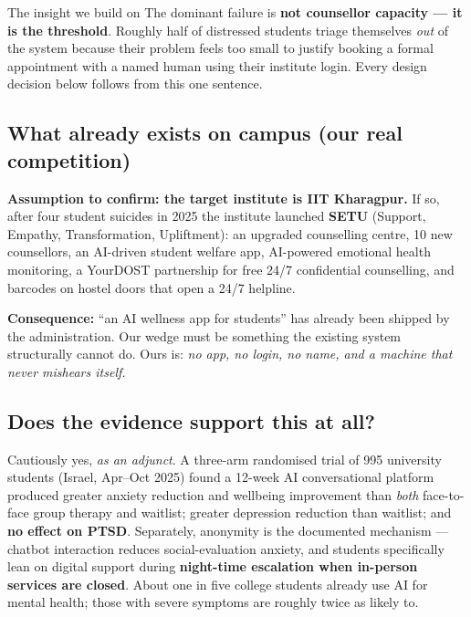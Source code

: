 \documentclass[11pt,a4paper]{article}
\begin{document}
\begin{keybox}{The insight we build on}
The dominant failure is \textbf{not counsellor capacity --- it is the threshold}.
Roughly half of distressed students triage themselves \emph{out} of the system because
their problem feels too small to justify booking a formal appointment with a named human
using their institute login. Every design decision below follows from this one sentence.
\end{keybox}

\subsection{What already exists on campus (our real competition)}

\textbf{Assumption to confirm: the target institute is IIT Kharagpur.}
If so, after four student suicides in 2025 the institute launched \textbf{SETU}
(Support, Empathy, Transformation, Upliftment): an upgraded counselling centre,
10 new counsellors, an AI-driven student welfare app, AI-powered emotional
health monitoring, a YourDOST partnership for free 24/7 confidential counselling,
and barcodes on hostel doors that open a 24/7 helpline.

\vspace{0.3em}
\textbf{Consequence:} ``an AI wellness app for students'' has already been shipped by the
administration. Our wedge must be something the existing system structurally cannot do.
Ours is: \emph{no app, no login, no name, and a machine that never mishears itself.}

\subsection{Does the evidence support this at all?}

Cautiously yes, \emph{as an adjunct}. A three-arm randomised trial of 995 university
students (Israel, Apr--Oct 2025) found a 12-week AI conversational platform produced
greater anxiety reduction and wellbeing improvement than \emph{both} face-to-face group
therapy and waitlist; greater depression reduction than waitlist; and \textbf{no effect
on PTSD}. Separately, anonymity is the documented mechanism --- chatbot interaction
reduces social-evaluation anxiety, and students specifically lean on digital support
during \textbf{night-time escalation when in-person services are closed}. About one in
five college students already use AI for mental health; those with severe symptoms are
roughly twice as likely to.
\end{document}
